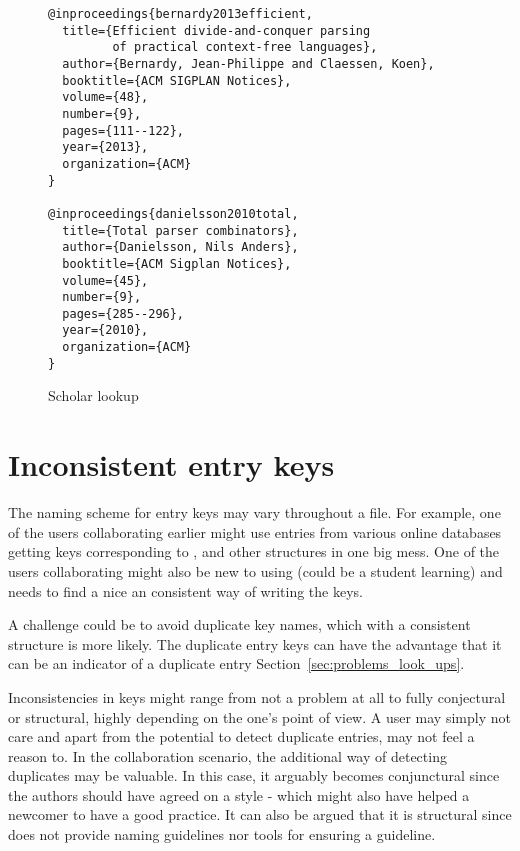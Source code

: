 \begin{figure}
  \centering
\begin{verbatim}
@inproceedings{bernardy2013efficient,
  title={Efficient divide-and-conquer parsing
         of practical context-free languages},
  author={Bernardy, Jean-Philippe and Claessen, Koen},
  booktitle={ACM SIGPLAN Notices},
  volume={48},
  number={9},
  pages={111--122},
  year={2013},
  organization={ACM}
}

@inproceedings{danielsson2010total,
  title={Total parser combinators},
  author={Danielsson, Nils Anders},
  booktitle={ACM Sigplan Notices},
  volume={45},
  number={9},
  pages={285--296},
  year={2010},
  organization={ACM}
}
\end{verbatim}
  \caption{Scholar lookup}
\label{fig:missing_org_scholar_lookup}
\end{figure}

\section{Inconsistent entry keys}
\label{sec:problems_inconsistent_keys}

The naming scheme for entry keys may vary throughout a {\bibtex} file.
For example, one of the users collaborating earlier might use entries
from various online databases getting keys corresponding to
,  and
other structures in one big mess.  One of the users collaborating
might also be new to using {\bibtex} (could be a student learning) and
needs to find a nice an consistent way of writing the keys.

A challenge could be to avoid duplicate key names, which with a
consistent structure is more likely.  The duplicate entry keys can
have the advantage that it can be an indicator of a duplicate entry
Section~\ref{sec:problems_look_ups}.

Inconsistencies in keys might range from not a problem at all to fully
conjectural or structural, highly depending on the one's point of
view.  A user may simply not care and apart from the potential to
detect duplicate entries, may not feel a reason to.  In the
collaboration scenario, the additional way of detecting duplicates may
be valuable.  In this case, it arguably becomes conjunctural since the
authors should have agreed on a style - which might also have helped a
newcomer to have a good practice.  It can also be argued that it is
structural since {\bibtex} does not provide naming guidelines nor
tools for ensuring a guideline.

